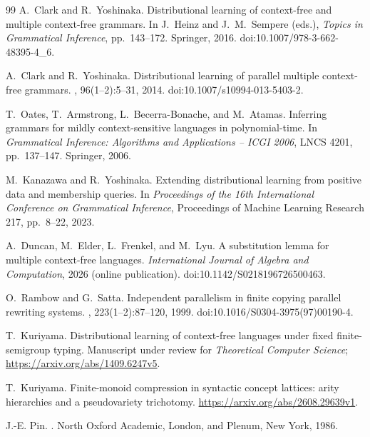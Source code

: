 \documentclass[11pt]{article}
\numberwithin{equation}{section}
\theoremstyle{plain}
\theoremstyle{definition}
\theoremstyle{remark}
\theoremstyle{plain}
\begin{document}
\begin{thebibliography}{99}
A.~Clark and R.~Yoshinaka.
\newblock Distributional learning of context-free and multiple context-free grammars.
\newblock In J.~Heinz and J.~M.~Sempere (eds.), \emph{Topics in Grammatical
Inference}, pp.~143--172. Springer, 2016.
\newblock doi:10.1007/978-3-662-48395-4\_6.

A.~Clark and R.~Yoshinaka.
\newblock Distributional learning of parallel multiple context-free grammars.
, 96(1--2):5--31, 2014.
\newblock doi:10.1007/s10994-013-5403-2.

T.~Oates, T.~Armstrong, L.~Becerra-Bonache, and M.~Atamas.
\newblock Inferring grammars for mildly context-sensitive languages in polynomial-time.
\newblock In {\em Grammatical Inference: Algorithms and Applications -- ICGI 2006},
LNCS 4201, pp.~137--147. Springer, 2006.

M.~Kanazawa and R.~Yoshinaka.
\newblock Extending distributional learning from positive data and membership queries.
\newblock In {\em Proceedings of the 16th International Conference on Grammatical Inference},
Proceedings of Machine Learning Research 217, pp.~8--22, 2023.

A.~Duncan, M.~Elder, L.~Frenkel, and M.~Lyu.
\newblock A substitution lemma for multiple context-free languages.
\newblock \emph{International Journal of Algebra and Computation},
2026 (online publication).
\newblock doi:10.1142/S0218196726500463.

O.~Rambow and G.~Satta.
\newblock Independent parallelism in finite copying parallel rewriting systems.
, 223(1--2):87--120, 1999.
\newblock doi:10.1016/S0304-3975(97)00190-4.

T.~Kuriyama.
\newblock Distributional learning of context-free languages under fixed
finite-semigroup typing.
\newblock Manuscript under review for \emph{Theoretical Computer Science};
\url{https://arxiv.org/abs/1409.6247v5}.

T.~Kuriyama.
\newblock Finite-monoid compression in syntactic concept lattices: arity
hierarchies and a pseudovariety trichotomy.
\newblock \url{https://arxiv.org/abs/2608.29639v1}.

J.-E. Pin.
.
\newblock North Oxford Academic, London, and Plenum, New York, 1986.


\end{thebibliography}
\end{document}
